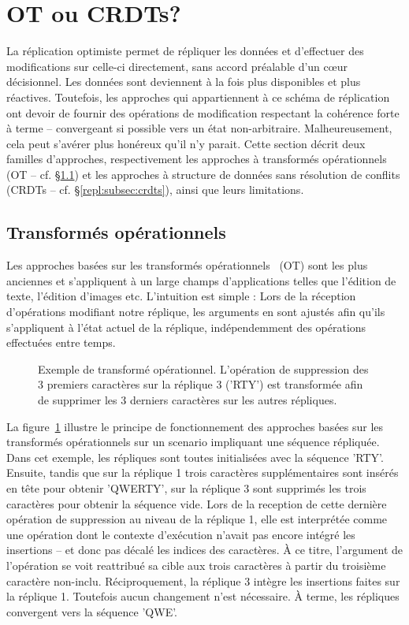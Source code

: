 
\section{OT ou CRDTs?}
\label{repl:sec:otorcrdts}

La réplication optimiste permet de répliquer les données et d'effectuer des
modifications sur celle-ci directement, sans accord préalable d'un cœur
décisionnel. Les données sont deviennent à la fois plus disponibles et plus
réactives. Toutefois, les approches qui appartiennent à ce schéma de réplication
ont devoir de fournir des opérations de modification respectant la cohérence
forte à terme -- convergeant si possible vers un état
non-arbitraire. Malheureusement, cela peut s'avérer plus honéreux qu'il n'y
parait. Cette section décrit deux familles d'approches, respectivement les
approches à transformés opérationnels (OT -- cf. §\ref{repl:subsec:ot}) et les
approches à structure de données sans résolution de conflits (CRDTs --
cf. §\ref{repl:subsec:crdts}), ainsi que leurs limitations.

\subsection{Transformés opérationnels}
\label{repl:subsec:ot}

Les approches basées sur les transformés opérationnels~\cite{sun1998operational,
  sun2009contextbased} (OT) sont les plus anciennes et s'appliquent à un large
champs d'applications telles que l'édition de texte, l'édition d'images
etc. L'intuition est simple : Lors de la réception d'opérations modifiant notre
réplique, les arguments en sont ajustés afin qu'ils s'appliquent à l'état actuel
de la réplique, indépendemment des opérations effectuées entre temps.

\begin{figure}
  \centering
  
  \caption{\label{repl:fig:otexample} Exemple de transformé
    opérationnel. L'opération de suppression des 3 premiers caractères sur la
    réplique 3 ('RTY') est transformée afin de supprimer les 3 derniers caractères
    sur les autres répliques.}
\end{figure}

La figure~\ref{repl:fig:otexample} illustre le principe de fonctionnement des
approches basées sur les transformés opérationnels sur un scenario impliquant
une séquence répliquée. Dans cet exemple, les répliques sont toutes initialisées
avec la séquence 'RTY'. Ensuite, tandis que sur la réplique 1 trois caractères
supplémentaires sont insérés en tête pour obtenir 'QWERTY', sur la réplique 3
sont supprimés les trois caractères pour obtenir la séquence vide. Lors de la
reception de cette dernière opération de suppression au niveau de la réplique 1,
elle est interprétée comme une opération dont le contexte d'exécution n'avait
pas encore intégré les insertions -- et donc pas décalé les indices des
caractères. À ce titre, l'argument de l'opération se voit reattribué sa cible
aux trois caractères à partir du troisième caractère non-inclu. Réciproquement,
la réplique 3 intègre les insertions faites sur la réplique 1. Toutefois aucun
changement n'est nécessaire. À terme, les répliques convergent vers la séquence
'QWE'.

